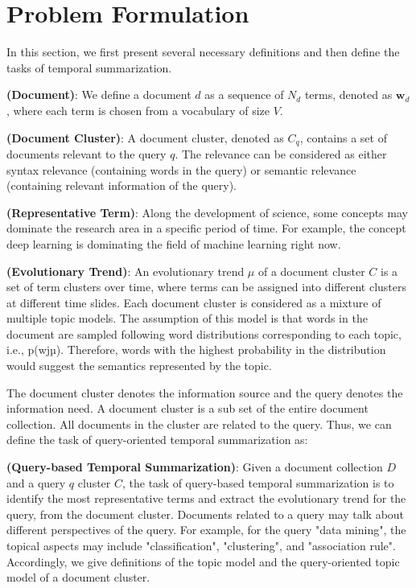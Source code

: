 \section{Problem Formulation}
\label{sec:problem}

In this section, we first present several necessary definitions and then define the tasks of temporal summarization.

\begin{definition}
\textbf{(Document)}:
We define a document $d$ as a sequence of $N_d$ terms, denoted as $\mathbf{w}_d$, where each term is chosen from a vocabulary of size $V$.
\end{definition}


\begin{definition}
\textbf{(Document Cluster)}: A document cluster, denoted as $C_q$, contains a set of documents relevant to the query $q$. The relevance can be considered as either syntax relevance (containing words in the query) or semantic relevance (containing relevant information of the query).
\end{definition}


\begin{definition}
\textbf{(Representative Term)}: Along the development of science, some concepts may dominate the research area in a specific period of time. For example, the concept deep learning is dominating the field of machine learning right now.
\end{definition}

\begin{definition}
\textbf{(Evolutionary Trend)}: An evolutionary trend $\mu$ of a document cluster $C$ is a set of term clusters over time, where terms can be assigned into different clusters at different time slides. Each document cluster is considered as a mixture of multiple topic models. The assumption of this model is that words in the document are sampled following word distributions corresponding to each topic, i.e., p(wjµ). Therefore, words with the highest probability in the distribution would suggest the semantics represented by the topic.
\end{definition}

The document cluster denotes the information source and the query denotes the information need. A document cluster is a sub set of the entire document collection. All documents in the cluster are related to the query. Thus, we can define the task of query-oriented temporal summarization as:

\begin{definition}
\textbf{(Query-based Temporal Summarization)}: Given a document collection $D$ and a query $q$ cluster $C$, the task of query-based temporal summarization is to identify the most representative terms and extract the evolutionary trend for the query, from the document cluster. Documents related to a query may talk about different perspectives of the query. For example, for the query "data mining", the topical aspects may include "classification", "clustering", and "association rule". Accordingly, we give definitions of the topic model and the query-oriented topic model of a document cluster.
\end{definition}


